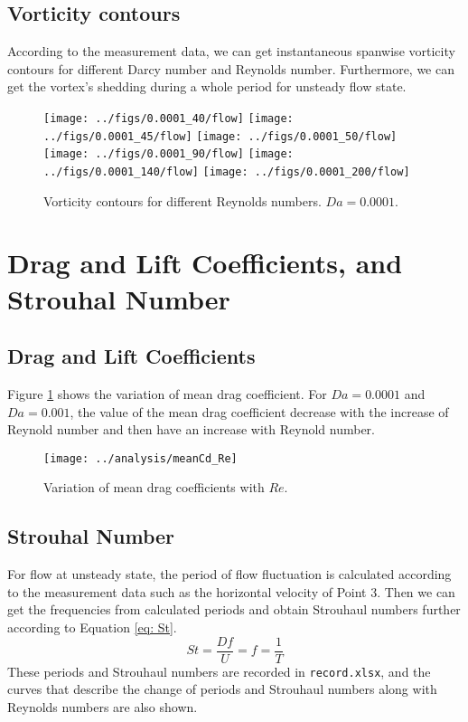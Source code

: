 \subsection{Vorticity contours}
According to the measurement data, we can get instantaneous spanwise vorticity contours for different Darcy number and Reynolds number. Furthermore, we can get the vortex's shedding during a whole period for unsteady flow state.

\begin{figure}
	\centering
	{\texttt{[image: ../figs/0.0001\_40/flow]}}
	{\texttt{[image: ../figs/0.0001\_45/flow]}}
	{\texttt{[image: ../figs/0.0001\_50/flow]}}
	{\texttt{[image: ../figs/0.0001\_90/flow]}}
	{\texttt{[image: ../figs/0.0001\_140/flow]}}
	{\texttt{[image: ../figs/0.0001\_200/flow]}}
	\caption{Vorticity contours for different Reynolds numbers.
		$Da=0.0001$.}
\end{figure}


\section{Drag and Lift Coefficients, and Strouhal Number}
\subsection{Drag and Lift Coefficients}
Figure \ref{fig: meanCd} shows the variation of mean drag coefficient. For $Da=0.0001$ and $Da=0.001$, the value of the mean drag coefficient decrease with the increase of Reynold number and then have an increase with Reynold number.

\begin{figure}
	\centering
	\texttt{[image: ../analysis/meanCd\_Re]}
	\caption{Variation of mean drag coefficients with $Re$.}
	\label{fig: meanCd}
\end{figure}

\subsection{Strouhal Number}
For flow at unsteady state, the period of flow fluctuation is calculated according to the measurement data such as the horizontal velocity of Point 3. Then we can get the frequencies from calculated periods and obtain Strouhaul numbers further according to Equation \ref{eq: St}.
\begin{equation}\label{eq: St}
St = \frac{Df}{U} = f = \frac{1}{T}
\end{equation}
These periods and Strouhaul numbers are recorded in \texttt{record.xlsx}, and the curves that describe the change of periods and Strouhaul numbers along with Reynolds numbers are also shown.

